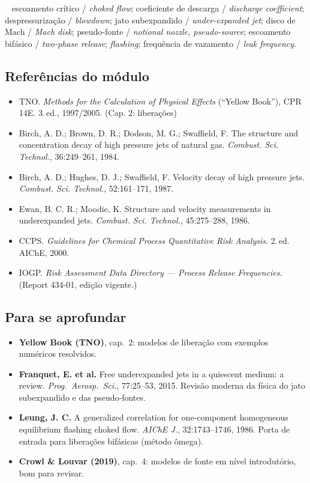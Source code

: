 \documentclass[10pt,a4paper,twocolumn,openany]{report}
\newcommand{\lead}[2]{\par\medskip\noindent{\color{#1}\bfseries #2}\ }
\newenvironment{chaves}{\lead{cinza}{Palavras-chave (PT/EN):}\small}{\par}
\newenvironment{refs}{\subsection*{Referências do módulo}\small}{\par}
\newenvironment{aprofundar}{\subsection*{\textcolor{amarelo}{Para se aprofundar}}\small}{\par}
\begin{document}
\begin{chaves}
escoamento crítico / \emph{choked flow}; coeficiente de descarga /
\emph{discharge coefficient}; despressurização / \emph{blowdown};
jato subexpandido / \emph{under-expanded jet}; disco de Mach / \emph{Mach
disk}; pseudo-fonte / \emph{notional nozzle, pseudo-source}; escoamento
bifásico / \emph{two-phase release}; \emph{flashing}; frequência de
vazamento / \emph{leak frequency}.
\end{chaves}

\begin{refs}
\begin{itemize}
  \item TNO. \emph{Methods for the Calculation of Physical Effects} (``Yellow Book''), CPR 14E. 3.\,ed., 1997/2005. (Cap. 2: liberações)
  \item Birch, A. D.; Brown, D. R.; Dodson, M. G.; Swaffield, F. The structure and concentration decay of high pressure jets of natural gas. \emph{Combust. Sci. Technol.}, 36:249--261, 1984.
  \item Birch, A. D.; Hughes, D. J.; Swaffield, F. Velocity decay of high pressure jets. \emph{Combust. Sci. Technol.}, 52:161--171, 1987.
  \item Ewan, B. C. R.; Moodie, K. Structure and velocity measurements in underexpanded jets. \emph{Combust. Sci. Technol.}, 45:275--288, 1986.
  \item CCPS. \emph{Guidelines for Chemical Process Quantitative Risk Analysis}. 2.\,ed. AIChE, 2000.
  \item IOGP. \emph{Risk Assessment Data Directory --- Process Release Frequencies}. (Report 434-01, edição vigente.)
\end{itemize}
\end{refs}

\begin{aprofundar}
\begin{itemize}[leftmargin=*]
  \item \textbf{Yellow Book (TNO)}, cap.\ 2: modelos de liberação com exemplos numéricos resolvidos.
  \item \textbf{Franquet, E. et al.} Free underexpanded jets in a quiescent medium: a review. \emph{Prog.\ Aerosp.\ Sci.}, 77:25--53, 2015. Revisão moderna da física do jato subexpandido e das pseudo-fontes.
  \item \textbf{Leung, J. C.} A generalized correlation for one-component homogeneous equilibrium flashing choked flow. \emph{AIChE J.}, 32:1743--1746, 1986. Porta de entrada para liberações bifásicas (método ômega).
  \item \textbf{Crowl \& Louvar (2019)}, cap.\ 4: modelos de fonte em nível introdutório, bom para revisar.
\end{itemize}
\end{aprofundar}
\end{document}
